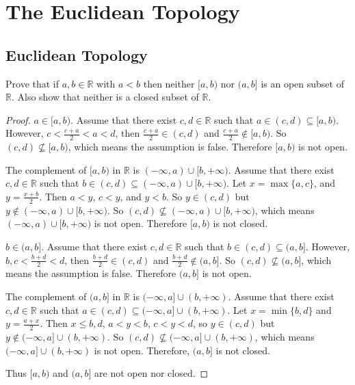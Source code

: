 \chapter{The Euclidean Topology}

\section{Euclidean Topology}

\begin{exercise}
    Prove that if $a, b\in \mathbb{R}$ with $a < b$ then neither $[a, b)$ nor $(a, b]$ is an open subset of $\mathbb{R}$. Also show that neither is a closed subset of $\mathbb{R}$.
\end{exercise}

\begin{proof}
    $a\in [a, b)$. Assume that there exist $c, d\in \mathbb{R}$ such that $a\in (c, d)\subseteq [a, b)$. However, $c < \frac{c+a}{2} < a < d$, then $\frac{c+a}{2}\in (c, d)$ and $\frac{c+a}{2}\notin [a, b)$. So $(c, d)\nsubseteq [a, b)$, which means the assumption is false. Therefore $[a, b)$ is not open.

                                    The complement of $[a, b)$ in $\mathbb{R}$ is $(-\infty, a)\cup [b, +\infty)$. Assume that there exist $c, d\in \mathbb{R}$ such that $b\in (c, d)\subseteq (-\infty, a)\cup [b, +\infty)$. Let $x = \max\{ a, c \}$, and $y = \frac{x + b}{2}$. Then $a < y$, $c < y$, and $y < b$. So $y\in (c, d)$ but $y\notin (-\infty, a)\cup [b, +\infty)$. So $(c, d)\nsubseteq (-\infty, a)\cup [b, +\infty)$, which means $(-\infty, a)\cup [b, +\infty)$ is not open. Therefore $[a, b)$ is not closed.

                                                                    $b\in (a, b]$. Assume that there exist $c, d\in \mathbb{R}$ such that $b\in (c, d)\subseteq (a, b]$. However, $b, c < \frac{b+d}{2} < d$, then $\frac{b+d}{2}\in (c, d)$ and $\frac{b+d}{2}\notin (a, b]$. So $(c, d)\nsubseteq (a, b]$, which means the assumption is false. Therefore $(a, b]$ is not open.

                                                The complement of $(a, b]$ in $\mathbb{R}$ is $(-\infty, a]\cup (b, +\infty)$. Assume that there exist $c, d\in \mathbb{R}$ such that $a\in (c, d)\subseteq (-\infty, a]\cup (b, +\infty)$. Let $x = \min\{ b, d \}$ and $y = \frac{a+x}{2}$. Then $x\leq b, d$, $a < y < b$, $c < y < d$, so $y\in (c, d)$ but $y\notin (-\infty, a]\cup (b, +\infty)$. So $(c, d)\nsubseteq (-\infty, a]\cup (b, +\infty)$, which means $(-\infty, a]\cup (b, +\infty)$ is not open. Therefore, $(a, b]$ is not closed.

    Thus $[a, b)$ and $(a, b]$ are not open nor closed.
\end{proof}
\newpage

